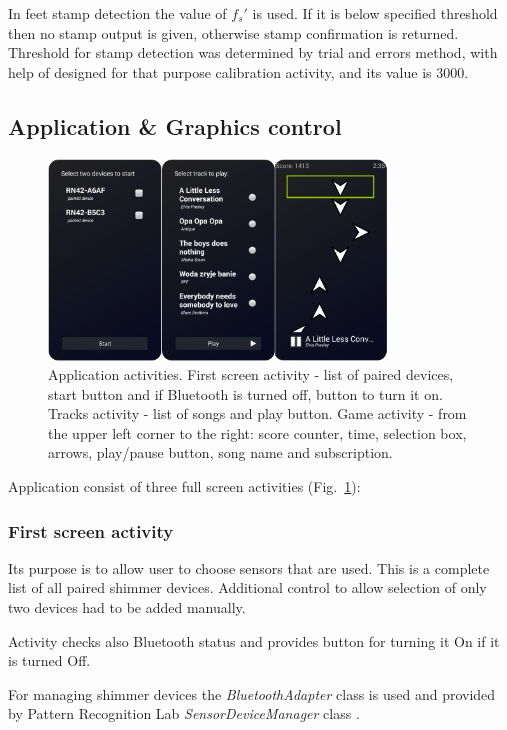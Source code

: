 \documentclass[conference]{IEEEtran}
\begin{document}
In feet stamp detection the value of $f_s'$ is used. If it is below specified threshold then no stamp output is given, otherwise stamp confirmation is returned. Threshold for stamp detection was determined by trial and errors method, with help of designed for that purpose calibration activity, and its value is $3000$.


\subsection{Application \& Graphics control}

\begin{figure}[!h]
    \centering
    \includegraphics[width=9cm]{Images/Activities.png}
    \caption{Application activities. First screen activity - list of paired devices, start button and if Bluetooth is turned off, button to turn it on.
    Tracks activity - list of songs and play button.
    Game activity - from the upper left corner to the right: score counter, time, selection box, arrows, play/pause button, song name and subscription.}
    \label{fig:Activities}
\end{figure}


Application consist of three full screen activities (Fig.~\ref{fig:Activities}):

\subsubsection{First screen activity}
Its purpose is to allow user to choose sensors that are used.
This is a complete list of all paired shimmer devices.
Additional control to allow selection of only two devices had to be added manually.

Activity checks also Bluetooth status and provides button for turning it On if it is turned Off.

For managing shimmer devices the \emph{BluetoothAdapter} class is used and provided by Pattern Recognition Lab \emph{SensorDeviceManager} class \cite{CS5}.
\end{document}
